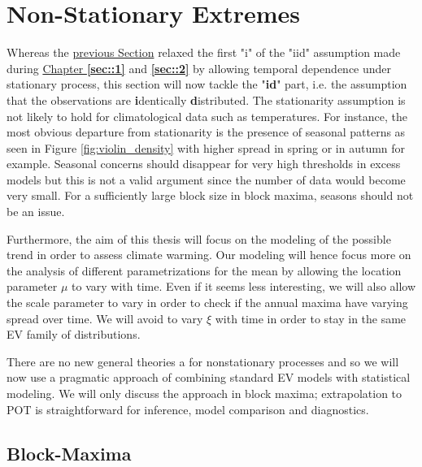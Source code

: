\section{Non-Stationary Extremes}\label{nstatio}

Whereas the \hyperref[sec:statio]{previous Section} relaxed the first "i" of the "iid" assumption made during  \hyperref[sec::1]{Chapter \textbf{\ref{sec::1}}} and \textbf{\ref{sec::2}} by allowing temporal dependence under stationary process, this section will now tackle the "\textbf{id}" part, i.e. the assumption that the observations are \textbf{i}dentically \textbf{d}istributed. 
The stationarity assumption is not likely to hold for climatological data such as temperatures. For instance, the most obvious departure from stationarity is the presence of seasonal patterns as seen in Figure \ref{fig:violin_density} with higher spread in spring or in autumn for example. Seasonal concerns should disappear for very high thresholds in excess models but this is not a valid argument since the number of data would become very small. For a sufficiently large block size in block maxima, seasons should not be an issue. 

Furthermore, the aim of this thesis will focus on the modeling of the possible trend in order to assess climate warming. 
Our modeling will hence focus more on the analysis of different parametrizations for the mean by allowing the location parameter $\mu$ to vary with time. Even if it seems less interesting, we will also allow the scale parameter to vary in order to check if the annual maxima have varying spread over time. We will avoid to vary $\xi$ with time in order to stay in the same EV family of distributions.

There are no new general theories a for nonstationary processes and so we will now use a pragmatic approach of combining standard EV models with statistical modeling.
We will only discuss the approach in block maxima; extrapolation to POT is straightforward for inference, model comparison and diagnostics.


\subsection{Block-Maxima}\label{sec:gev_nonstatio}

